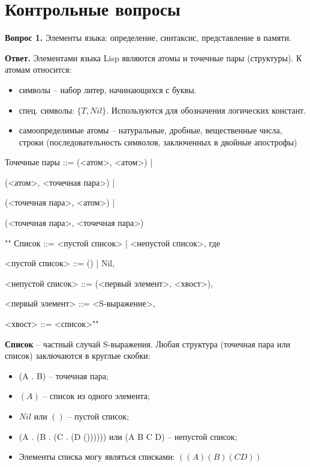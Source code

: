 \documentclass[12pt]{report}
\begin{document}
	\chapter*{Контрольные вопросы}
	\textbf{Вопрос 1.} Элементы языка: определение, синтаксис, представление в памяти.
	
	\textbf{Ответ.} Элементами языка Lisp являются атомы и точечные пары (структуры). К атомам относится:
	
	\begin{itemize}
		\item символы -- набор литер, начинающихся с буквы.
		\item спец. символы: $\{T, Nil\}$. Используются для обозначения логических констант.
		\item самоопределимые атомы -- натуральные, дробные, вещественные числа, строки (последовательность символов, заключенных в двойные апострофы)
	\end{itemize}
		
	Точечные пары ::= (<атом>, <атом>) |
	
	(<атом>, <точечная пара>) |
	
	(<точечная пара>, <атом>) |
	
	(<точечная пара>, <точечная пара>)
	
	
	""\newline
	\indent Список ::= <пустой список> | <непустой список>, где
	
	<пустой список> ::= () | Nil,
	
	<непустой список> ::= (<первый элемент>, <хвост>),
	
	<первый элемент> ::= <S-выражение>,
	
	<хвост> ::= <список>""\newline
	
	\indent \textbf{Список} -- частный случай S-выражения. Любая структура (точечная пара или список) заключаются в круглые скобки:
	
	\begin{itemize}
		\item (A . B) -- точечная пара;
		\item $(A)$ -- список из одного элемента;
		\item $Nil$ или $()$ -- пустой список;
		\item (A . (B . (C . (D ()))))) или (A B C D) -- непустой список;
		\item Элементы списка могу являться списками: $((A)(B)(CD))$
	\end{itemize}
	
\end{document}

